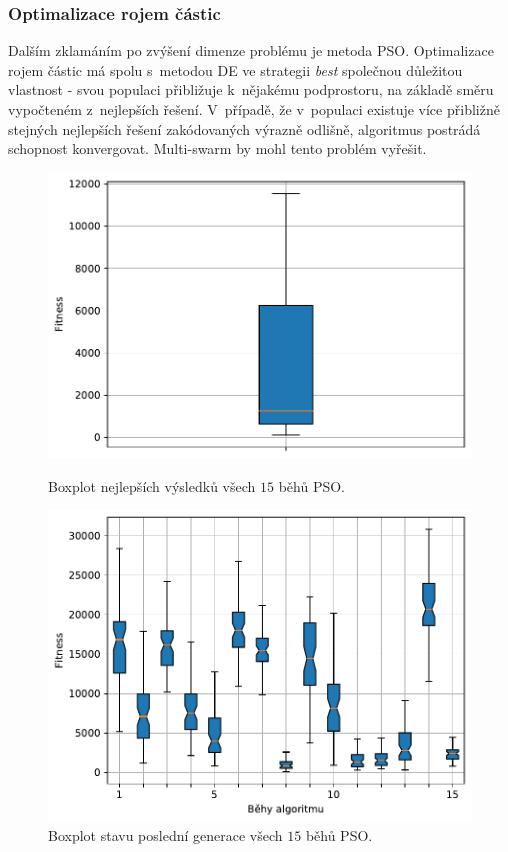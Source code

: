 \subsubsection{Optimalizace rojem částic}
Dalším zklamáním po zvýšení dimenze problému je metoda PSO. Optimalizace rojem částic má spolu s~metodou DE ve strategii \emph{best} společnou důležitou vlastnost - svou populaci přibližuje k~nějakému podprostoru, na základě směru vypočteném z~nejlepších řešení. V~případě, že v~populaci existuje více přibližně stejných nejlepších řešení zakódovaných výrazně odlišně, algoritmus postrádá schopnost konvergovat. Multi-swarm by mohl tento problém vyřešit.

\begin{figure}[H]
\begin{minipage}[t]{0.475\linewidth}
\includegraphics[width=\linewidth]{obrazky-figures/statistics/HIFU/blob/20/PSO/bestsBoxplot_WithOutliers.pdf}
\caption{Boxplot nejlepších výsledků všech $15$ běhů PSO.}
\label{fg:hifu:blob:pso:best}
\end{minipage}
\hfill
\begin{minipage}[t]{0.475\linewidth}
\includegraphics[width=\linewidth]{obrazky-figures/statistics/HIFU/blob/20/PSO/lastGenBoxplots.pdf}
\caption{Boxplot stavu poslední generace všech $15$ běhů PSO.}
\label{fg:hifu:blob:pso:lastGen}
\end{minipage}
\end{figure}


